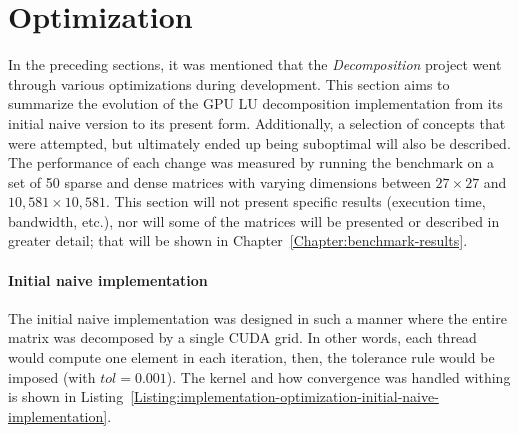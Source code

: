 \section{Optimization \TO}\label{Section:implementation-optimization}
In the preceding sections, it was mentioned that the \textit{Decomposition} project went through various optimizations during development. This section aims to summarize the evolution of the GPU LU decomposition implementation from its initial naive version to its present form. Additionally, a selection of concepts that were attempted, but ultimately ended up being suboptimal will also be described. The performance of each change was measured by running the benchmark on a set of 50 sparse and dense matrices with varying dimensions between $ 27 \times 27 $ and $ 10,581 \times 10,581 $. This section will not present specific results (execution time, bandwidth, etc.), nor will some of the matrices will be presented or described in greater detail; that will be shown in Chapter~\ref{Chapter:benchmark-results}.

\paragraph{Initial naive implementation}\label{Paragraph:implementation-optimization-initial-naive-implementation}
The initial naive implementation was designed in such a manner where the entire matrix was decomposed by a single CUDA grid. In other words, each thread would compute one element in each iteration, then, the tolerance rule would be imposed (with $ tol = 0.001 $). The kernel and how convergence was handled withing  is shown in Listing~\ref{Listing:implementation-optimization-initial-naive-implementation}.

